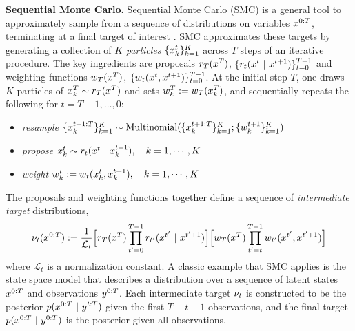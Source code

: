 

\textbf{Sequential Monte Carlo.}
Sequential Monte Carlo (SMC) is a general tool to approximately sample from a sequence of distributions on variables $x^{0:T}$, terminating at a final target of interest
\citep{chopin2020introduction,doucet2001sequential,gordon1993novel,naesseth2019elements}. 
SMC approximates these targets by generating a collection of $K$ \emph{particles} $\{x^{t}_k\}_{k=1}^K$ across $T$ steps of an iterative procedure.
The key ingredients are proposals $r_T(x^{T})$, $\{r_t(x^{t} ~\vert~ x^{t+1})\}_{t=0}^{T-1}$ 
and weighting functions $w_T(x^{T})$, $\{w_t(x^{t}, x^{t+1})\}_{t=0}^{T-1}$. 
At the initial step $T$, one draws $K$ particles of $x^{T}_k \sim r_T(x^{T})$ and sets $w^{T}_k:= w_T(x^{T}_k)$, 
and sequentially repeats the following for $t=T-1, \dots, 0$: 
\vspace{-0.2em}
\begin{itemize}
    \item \emph{resample} \qquad $\{ x^{t+1:T}_k \}_{k=1}^K \sim \textrm{Multinomial}(\{ x^{t+1:T}_k \}_{k=1}^K; \{w^{t+1}_k \}_{k=1}^K)$ %
    \item  \emph{propose} \qquad $x^{t}_k \sim r_t(x^{t} ~\vert~ x^{t+1}_k), \quad k=1, \cdots, K$ 
    \item \emph{weight}  \qquad \quad $w^{t}_k := w_t(x^{t}_k, x^{t+1}_k), \quad k=1,\cdots, K$
\end{itemize}
\vspace{-0.2em}

The proposals and weighting functions together define a sequence of \emph{intermediate target} distributions,
\begin{equation}\label{eq:final-target}
    \nu_t(x^{0:T}) 
    :=\frac{1}{\mathcal{L}_t} 
        \Big[ r_T(x^{T})  \prod_{t^\prime=0}^{T-1} r_{t^\prime}(x^{t^\prime}~\vert~  x^{t^\prime+1})  \Big] 
        \Big[ w_T(x^{T})
        \prod_{t^\prime =t}^{T-1} w_{t^\prime}(x^{t^\prime}, x^{t^\prime+1}) \Big]  
\end{equation}
where $\mathcal{L}_t$ is a normalization constant.
A classic example that SMC applies is the state space model 
\citep[Chapter 1]{naesseth2019elements} 
that describes a distribution over a sequence of latent states $x^{0:T}$ and observations  $y^{0:T}$. 
Each intermediate target $\nu_t$ is constructed to be the posterior $p(x^{0:T}~\vert~ y^{t:T})$ given the first $T-t+1$ observations, and the final target $p(x^{0:T} ~\vert~ y^{0:T})$ is the  posterior given all observations. 


